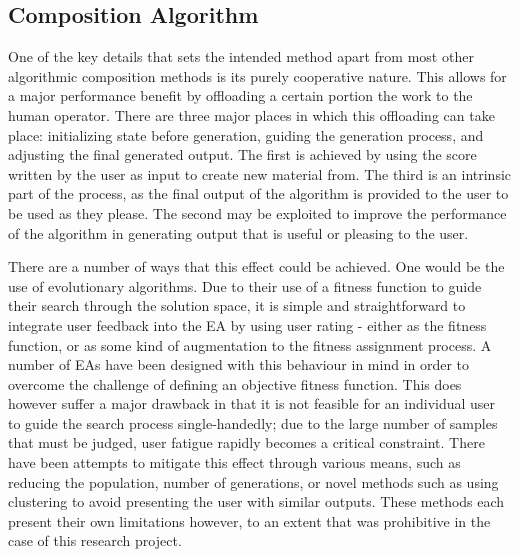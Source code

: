 \documentclass[ author={Stephen Livermore-Tozer},
				supervisor={Dr. Peter Flach},
				degree={MEng},
				title={Performing Algorithmic Co-composition Using Machine Learning},
				subtitle={},
				type={research},
				year={2016} ]{dissertation}
\begin{document}
	\subsection{Composition Algorithm}
	
	One of the key details that sets the intended method apart from most other algorithmic composition methods is its purely cooperative nature. This allows for a major performance benefit by offloading a certain portion the work to the human operator. There are three major places in which this offloading can take place: initializing state before generation, guiding the generation process, and adjusting the final generated output. The first is achieved by using the score written by the user as input to create new material from. The third is an intrinsic part of the process, as the final output of the algorithm is provided to the user to be used as they please. The second may be exploited to improve the performance of the algorithm in generating output that is useful or pleasing to the user.
	
	
	There are a number of ways that this effect could be achieved. One would be the use of evolutionary algorithms. Due to their use of a fitness function to guide their search through the solution space, it is simple and straightforward to integrate user feedback into the EA by using user rating - either as the fitness function, or as some kind of augmentation to the fitness assignment process. A number of EAs have been designed with this behaviour in mind in order to overcome the challenge of defining an objective fitness function. This does however suffer a major drawback in that it is not feasible for an individual user to guide the search process single-handedly; due to the large number of samples that must be judged, user fatigue rapidly becomes a critical constraint. There have been attempts to mitigate this effect through various means, such as reducing the population, number of generations, or novel methods such as using clustering to avoid presenting the user with similar outputs. These methods each present their own limitations however, to an extent that was prohibitive in the case of this research project. 
\end{document}
